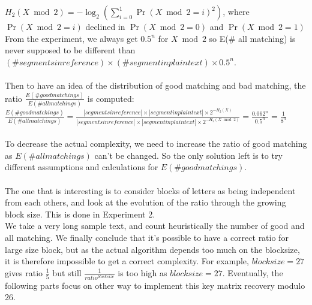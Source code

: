 \documentclass{article}
\begin{document}
$H_{2}(X \bmod 2) = -\log_2(\sum_{i=0}^{1}{\Pr(X \bmod 2 =i)^2})$, where $\Pr(X \bmod 2=i)$ declined in $\Pr(X \bmod 2=0)$ and $\Pr(X \bmod 2 =1)$\\
From the experiment, we always get $0.5^n$ for $X \bmod 2$ so E(\# all matching) is never supposed to be different than $(\# segments in reference) \times (\#segment in plaintext) \times 0.5^n$.\\
\\
Then to have an idea of the distribution of good matching and bad matching, the ratio $\frac{E(\# good matchings)}{E(\# all matchings)}$ is computed: $\frac{E(\# good matchings)}{E(\# all matchings)} = \frac{|segments in reference| \times |segment in plaintext| \times 2^{-H_{2}(X)}}{|segments in reference| \times |segment in plaintext| \times 2^{-H_{2}(X \bmod 2)}}  = \frac{0.062^n}{0.5^n} = \frac{1}{8^n}$\\
\\
To decrease the actual complexity, we need to increase the ratio of good matching as $E(\# all matchings)$ can't be changed. So the only solution left is to try different assumptions and calculations for $E(\# good matchings)$.\\
\\
The one that is interesting is to consider blocks of letters as being independent from each others, and look at the evolution of the ratio through the growing block size. This is done in Experiment 2.\\
We take a very long sample text, and count heuristically the number of good and all matching. 
We finally conclude that it's possible to have a correct ratio for large size block, but as the actual algorithm depends too much on the blocksize, it is therefore impossible to get a correct complexity. For example, $blocksize=27$ gives ratio $\frac{1}{5}$ but still $\frac{1}{ratio^{blocksize}}$ is too high as $blocksize = 27$.
Eventually, the following parts focus on other way to implement this key matrix recovery modulo 26.\\
\end{document}
